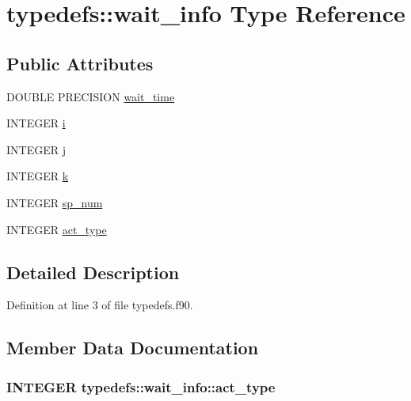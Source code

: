 \hypertarget{typetypedefs_1_1wait__info}{
\section{typedefs::wait\_\-info Type Reference}
\label{typetypedefs_1_1wait__info}
}
\subsection*{Public Attributes}
\begin{DoxyCompactItemize}
\item 
DOUBLE PRECISION \hyperlink{typetypedefs_1_1wait__info_acdcf8580da31a315f32ffffad73bd9be}{wait\_\-time}
\item 
INTEGER \hyperlink{typetypedefs_1_1wait__info_a441f92d29ec79adae0f71f538b1b6f74}{i}
\item 
INTEGER \hyperlink{typetypedefs_1_1wait__info_a1752c3e6528ab490fea5c4b0928fb484}{j}
\item 
INTEGER \hyperlink{typetypedefs_1_1wait__info_a7b76d574e1f61f0167fcc70af7779329}{k}
\item 
INTEGER \hyperlink{typetypedefs_1_1wait__info_a9b6ff019fc78e04005e2dde1b603eecb}{sp\_\-num}
\item 
INTEGER \hyperlink{typetypedefs_1_1wait__info_a1c29425ab2f66b53c624cfcfe4147050}{act\_\-type}
\end{DoxyCompactItemize}


\subsection{Detailed Description}


Definition at line 3 of file typedefs.f90.

\subsection{Member Data Documentation}
\hypertarget{typetypedefs_1_1wait__info_a1c29425ab2f66b53c624cfcfe4147050}{
\subsubsection[{act\_\-type}]{\setlength{\rightskip}{0pt plus 5cm}INTEGER {\bf typedefs::wait\_\-info::act\_\-type}}}
\label{typetypedefs_1_1wait__info_a1c29425ab2f66b53c624cfcfe4147050}


